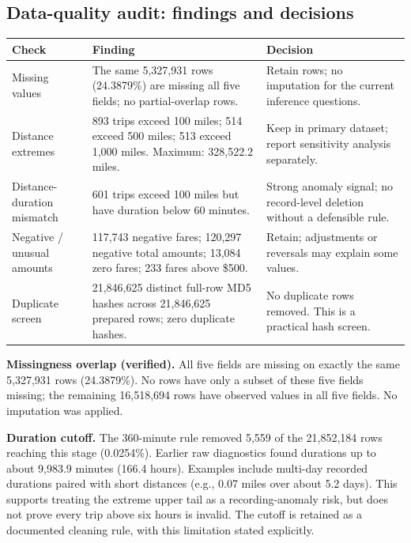\documentclass[10pt,a4paper]{article}
\begin{document}
\subsection{Data-quality audit: findings and decisions}
\small
\begin{tabularx}{\linewidth}{@{}L{3.0cm}L{7.0cm}Y@{}}
\toprule
\textbf{Check} & \textbf{Finding} & \textbf{Decision}\\
\midrule
Missing values & The same 5,327,931 rows (24.3879\%) are missing all five fields; no partial-overlap rows. & Retain rows; no imputation for the current inference questions.\\
Distance extremes & 893 trips exceed 100 miles; 514 exceed 500 miles; 513 exceed 1,000 miles. Maximum: 328,522.2 miles. & Keep in primary dataset; report sensitivity analysis separately.\\
Distance-duration mismatch & 601 trips exceed 100 miles but have duration below 60 minutes. & Strong anomaly signal; no record-level deletion without a defensible rule.\\
Negative / unusual amounts & 117,743 negative fares; 120,297 negative total amounts; 13,084 zero fares; 233 fares above \$500. & Retain; adjustments or reversals may explain some values.\\
Duplicate screen & 21,846,625 distinct full-row MD5 hashes across 21,846,625 prepared rows; zero duplicate hashes. & No duplicate rows removed. This is a practical hash screen.\\
\bottomrule
\end{tabularx}
\normalsize

\textbf{Missingness overlap (verified).} All five fields are missing on exactly the same 5,327,931 rows (24.3879\%). No rows have only a subset of these five fields missing; the remaining 16,518,694 rows have observed values in all five fields. No imputation was applied.

\textbf{Duration cutoff.} The 360-minute rule removed 5,559 of the 21,852,184 rows reaching this stage (0.0254\%). Earlier raw diagnostics found durations up to about 9,983.9 minutes (166.4 hours). Examples include multi-day recorded durations paired with short distances (e.g., 0.07 miles over about 5.2 days). This supports treating the extreme upper tail as a recording-anomaly risk, but does not prove every trip above six hours is invalid. The cutoff is retained as a documented cleaning rule, with this limitation stated explicitly.

\twocolumn
\end{document}
